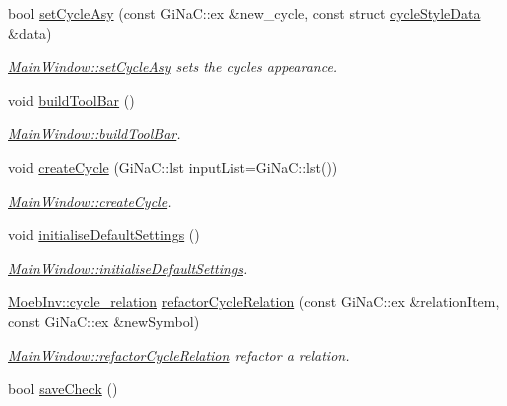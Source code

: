 \begin{DoxyCompactItemize}
bool \mbox{\hyperlink{class_main_window_a633c8594fbb906b2e914a4b3bbf50d97}{set\+Cycle\+Asy}} (const Gi\+Na\+C\+::ex \&new\+\_\+cycle, const struct \mbox{\hyperlink{structcycle_style_data}{cycle\+Style\+Data}} \&data)
\begin{DoxyCompactList}\small\item\em \mbox{\hyperlink{class_main_window_a633c8594fbb906b2e914a4b3bbf50d97}{Main\+Window\+::set\+Cycle\+Asy}} sets the cycles appearance. \end{DoxyCompactList}\item 
void \mbox{\hyperlink{class_main_window_a2e45b04e116068ed411c9738fbdc71ff}{build\+Tool\+Bar}} ()
\begin{DoxyCompactList}\small\item\em \mbox{\hyperlink{class_main_window_a2e45b04e116068ed411c9738fbdc71ff}{Main\+Window\+::build\+Tool\+Bar}}. \end{DoxyCompactList}\item 
void \mbox{\hyperlink{class_main_window_abc46822a29b8c97fbe12e030b30444f7}{create\+Cycle}} (Gi\+Na\+C\+::lst input\+List=Gi\+Na\+C\+::lst())
\begin{DoxyCompactList}\small\item\em \mbox{\hyperlink{class_main_window_abc46822a29b8c97fbe12e030b30444f7}{Main\+Window\+::create\+Cycle}}. \end{DoxyCompactList}\item 
void \mbox{\hyperlink{class_main_window_a72e9fc361f05240f439fb17ff78a40cc}{initialise\+Default\+Settings}} ()
\begin{DoxyCompactList}\small\item\em \mbox{\hyperlink{class_main_window_a72e9fc361f05240f439fb17ff78a40cc}{Main\+Window\+::initialise\+Default\+Settings}}. \end{DoxyCompactList}\item 
\mbox{\hyperlink{class_moeb_inv_1_1cycle__relation}{Moeb\+Inv\+::cycle\+\_\+relation}} \mbox{\hyperlink{class_main_window_a9fe708c683a2dd952ccb72e04cf4a62d}{refactor\+Cycle\+Relation}} (const Gi\+Na\+C\+::ex \&relation\+Item, const Gi\+Na\+C\+::ex \&new\+Symbol)
\begin{DoxyCompactList}\small\item\em \mbox{\hyperlink{class_main_window_a9fe708c683a2dd952ccb72e04cf4a62d}{Main\+Window\+::refactor\+Cycle\+Relation}} refactor a relation. \end{DoxyCompactList}\item 
bool \mbox{\hyperlink{class_main_window_ae2defb68c51e884b7031693b20bdd556}{save\+Check}} ()

\end{DoxyCompactItemize}
